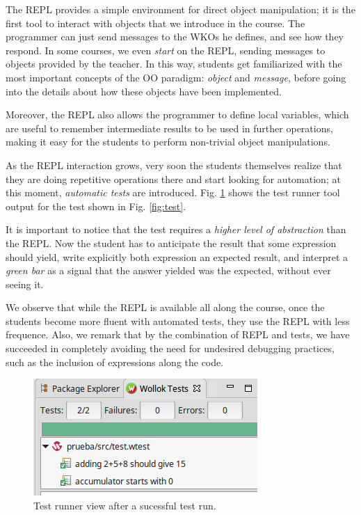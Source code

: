 The REPL provides a simple environment for direct object manipulation; it is the first tool to interact with objects that we introduce in the course.
The programmer can just send messages to the WKOs he defines, and see how they respond. 
In some courses, we even \emph{start} on the REPL, sending messages to objects provided by the teacher.
In this way, students get familiarized with the most important concepts of the OO paradigm: \emph{object} and \emph{message}, before going into the details about how these objects have been implemented.

Moreover, the REPL also allows the programmer to define local variables, which are useful to remember intermediate results to be used in further operations, making it easy for the students to perform non-trivial object manipulations.

\medskip
As the REPL interaction grows, very soon the students themselves realize that they are doing repetitive operations there and start looking for automation;
at this moment, \emph{automatic tests} are introduced.
Fig. \ref{fig:testRunner.png} shows the test runner tool output for the test shown in Fig. \ref{fig:test}.

It is important to notice that the test requires a \emph{higher level of abstraction} than the REPL.
Now the student has to anticipate the result that some expression should yield, write explicitly both expression an expected result, and interpret a \emph{green bar} as a signal that the answer yielded was the expected, without ever seeing it.

We observe that while the REPL is available all along the course, once the students become more fluent with automated tests, they use the REPL with less frequence.
Also, we remark that by the combination of REPL and tests, we have succeeded in completely avoiding the need for undesired debugging practices, such as the inclusion of  expressions along the code.

\begin{figure}[ht]
    \centering
	\includegraphics[scale=0.6]{images/testRunner.png}
    \caption{Test runner view after a sucessful test run.}
    \label{fig:testRunner.png}
\end{figure}


